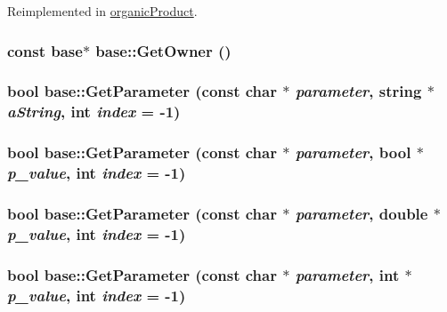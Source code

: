 Reimplemented in \hyperlink{classorganic_product_a1ff3dd7c96d3d9fd7dee39aafc9cc0a5}{organicProduct}.\hypertarget{classbase_a9b463ca5ce18a3bec36b17c8a4b66d89}{
\subsubsection[{GetOwner}]{\setlength{\rightskip}{0pt plus 5cm}const {\bf base}$\ast$ base::GetOwner ()}}
\label{classbase_a9b463ca5ce18a3bec36b17c8a4b66d89}
\hypertarget{classbase_a02555c2565ace1d8e91dd539e38a74ca}{
\subsubsection[{GetParameter}]{\setlength{\rightskip}{0pt plus 5cm}bool base::GetParameter (const char $\ast$ {\em parameter}, \/  string $\ast$ {\em aString}, \/  int {\em index} = {\ttfamily -\/1})}}
\label{classbase_a02555c2565ace1d8e91dd539e38a74ca}
\hypertarget{classbase_a9cadba73da20536578f34f7e020d4c3e}{
\subsubsection[{GetParameter}]{\setlength{\rightskip}{0pt plus 5cm}bool base::GetParameter (const char $\ast$ {\em parameter}, \/  bool $\ast$ {\em p\_\-value}, \/  int {\em index} = {\ttfamily -\/1})}}
\label{classbase_a9cadba73da20536578f34f7e020d4c3e}
\hypertarget{classbase_ac3ea2aa929c9e33a064b9de01bf65788}{
\subsubsection[{GetParameter}]{\setlength{\rightskip}{0pt plus 5cm}bool base::GetParameter (const char $\ast$ {\em parameter}, \/  double $\ast$ {\em p\_\-value}, \/  int {\em index} = {\ttfamily -\/1})}}
\label{classbase_ac3ea2aa929c9e33a064b9de01bf65788}
\hypertarget{classbase_a2643c255e2ae69b02c1ef7a427743453}{
\subsubsection[{GetParameter}]{\setlength{\rightskip}{0pt plus 5cm}bool base::GetParameter (const char $\ast$ {\em parameter}, \/  int $\ast$ {\em p\_\-value}, \/  int {\em index} = {\ttfamily -\/1})}}
